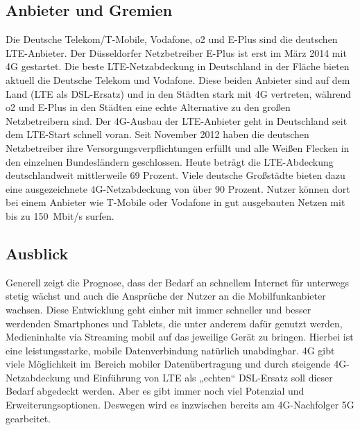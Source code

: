 \begin{multicols}{3}
\subsection*{Anbieter und Gremien} 

Die Deutsche Telekom/T-Mobile, Vodafone, o2 und E-Plus sind die deutschen LTE-Anbieter. Der Düsseldorfer Netzbetreiber E-Plus ist erst im März 2014 mit 4G gestartet. Die beste LTE-Netzabdeckung in Deutschland in der Fläche bieten aktuell die Deutsche Telekom und Vodafone. Diese beiden Anbieter sind auf dem Land (LTE als DSL-Ersatz) und in den Städten stark mit 4G vertreten, während o2 und E-Plus in den Städten eine echte Alternative zu den großen Netzbetreibern sind.
Der 4G-Ausbau der LTE-Anbieter geht in Deutschland seit dem LTE-Start schnell voran. Seit November 2012 haben die deutschen Netzbetreiber ihre Versorgungsverpflichtungen erfüllt und alle Weißen Flecken in den einzelnen Bundesländern geschlossen. Heute beträgt die LTE-Abdeckung deutschlandweit mittlerweile 69 Prozent. Viele deutsche Großstädte bieten dazu eine ausgezeichnete 4G-Netzabdeckung von über 90 Prozent. Nutzer können dort bei einem Anbieter wie T-Mobile oder Vodafone in gut ausgebauten Netzen mit bis zu \SI{150}{Mbit/s} surfen. ~\cite{4GLTE.7}

\subsection*{Ausblick}
Generell zeigt die Prognose, dass der Bedarf an schnellem Internet für unterwegs stetig wächst und auch die Ansprüche der Nutzer an die Mobilfunkanbieter wachsen. Diese Entwicklung geht einher mit immer schneller und besser werdenden Smartphones und Tablets, die unter anderem dafür genutzt werden, Medieninhalte via Streaming mobil auf das jeweilige Gerät zu bringen. Hierbei ist eine leistungsstarke, mobile Datenverbindung natürlich unabdingbar. 4G gibt viele Möglichkeit im Bereich mobiler Datenübertragung und durch steigende 4G-Netzabdeckung und Einführung von LTE als „echten“ DSL-Ersatz soll dieser Bedarf abgedeckt werden. Aber es gibt immer noch viel Potenzial und Erweiterungsoptionen. Deswegen wird es inzwischen bereits am 4G-Nachfolger 5G gearbeitet. 


\printbibliography[segment=9,heading=subbibliography]
\end{multicols}


\newpage
